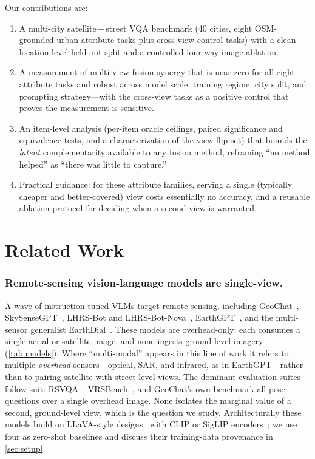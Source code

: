 \documentclass[runningheads]{llncs}
\begin{document}
Our contributions are:
\begin{enumerate}
  \item A multi-city satellite\,$+$\,street VQA benchmark (\num{40} cities, eight
  OSM-grounded urban-attribute tasks plus cross-view control tasks) with a clean
  location-level held-out split and a controlled four-way image ablation.
  \item A measurement of multi-view fusion synergy that is near zero for all
  eight attribute tasks and robust across model scale, training regime, city
  split, and prompting strategy---with the cross-view tasks as a positive control
  that proves the measurement is sensitive.
  \item An item-level analysis (per-item oracle ceilings, paired significance and
  equivalence tests, and a characterization of the view-flip set) that bounds the
  \emph{latent} complementarity available to any fusion method, reframing ``no
  method helped'' as ``there was little to capture.''
  \item Practical guidance: for these attribute families, serving a single
  (typically cheaper and better-covered) view costs essentially no accuracy, and
  a reusable ablation protocol for deciding when a second view is warranted.
\end{enumerate}

\section{Related Work}
\label{sec:related}

\subsubsection{Remote-sensing vision-language models are single-view.}
A wave of instruction-tuned VLMs target remote sensing, including
GeoChat~\cite{geochat2024}, SkySenseGPT~\cite{skysensegpt2024},
LHRS-Bot and LHRS-Bot-Nova~\cite{lhrsbot2024,lhrsbotnova2025}, EarthGPT~\cite{zhang2024earthgpt},
and the multi-sensor generalist EarthDial~\cite{earthdial2025}. These models are
overhead-only: each consumes a single aerial or satellite image, and none ingests
ground-level imagery (\cref{tab:models}). Where ``multi-modal'' appears in this
line of work it refers to multiple \emph{overhead} sensors---optical, SAR, and
infrared, as in EarthGPT---rather than to pairing satellite with street-level
views. The dominant evaluation suites follow suit: RSVQA~\cite{lobry2020rsvqa},
VRSBench~\cite{li2024vrsbench}, and GeoChat's own benchmark all pose questions
over a single overhead image. None isolates the marginal value of a second,
ground-level view, which is the question we study. Architecturally these models
build on LLaVA-style designs~\cite{llava_2023,llava15_2024} with CLIP or SigLIP
encoders~\cite{clip_2021,siglip_2023}; we use four as zero-shot baselines and
discuss their training-data provenance in \cref{sec:setup}.
\end{document}
